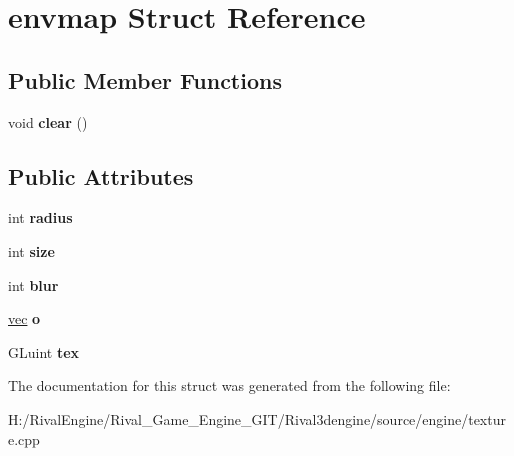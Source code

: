 \hypertarget{structenvmap}{}\section{envmap Struct Reference}
\label{structenvmap}
\subsection*{Public Member Functions}
\begin{DoxyCompactItemize}
\item 
\mbox{\label{structenvmap_a33710258484f4def80c3e4e118f180d4}} 
void {\bfseries clear} ()
\end{DoxyCompactItemize}
\subsection*{Public Attributes}
\begin{DoxyCompactItemize}
\item 
\mbox{\label{structenvmap_ad09512d44815d54a48a3d121a9452367}} 
int {\bfseries radius}
\item 
\mbox{\label{structenvmap_a8477e381c937c54b52e53029f1082878}} 
int {\bfseries size}
\item 
\mbox{\label{structenvmap_a61a4748a1a96822c51c5c6142f7c7792}} 
int {\bfseries blur}
\item 
\mbox{\label{structenvmap_a652614f98da0ecda8764c55b33c19709}} 
\hyperlink{structvec}{vec} {\bfseries o}
\item 
\mbox{\label{structenvmap_a3cfad0c28f680d4aa113ab74a21b15cb}} 
G\+Luint {\bfseries tex}
\end{DoxyCompactItemize}


The documentation for this struct was generated from the following file\+:\begin{DoxyCompactItemize}
\item 
H\+:/\+Rival\+Engine/\+Rival\+\_\+\+Game\+\_\+\+Engine\+\_\+\+G\+I\+T/\+Rival3dengine/source/engine/texture.\+cpp\end{DoxyCompactItemize}
